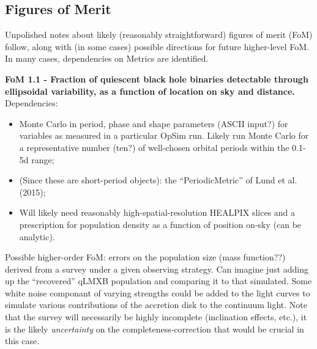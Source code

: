 
\subsection{Figures of Merit}
\label{sec:keyword:MW_Disk_metrics}


Unpolished notes about likely (reasonably straightforward) figures of
merit (FoM) follow, along with (in some cases) possible directions for
future higher-level FoM. In many cases, dependencies on
Metrics are identified.  


{\bf FoM 1.1 - Fraction of quiescent
  black hole binaries detectable through ellipsoidal variability, as a function of location on sky and distance.}
Dependencies:
\begin{itemize}
  \item Monte Carlo in period, phase and shape parameters (ASCII input?) for variables as measured in a particular OpSim run. Likely run Monte Carlo for a representative number (ten?) of well-chosen orbital periods within the 0.1-5d range;
  \item (Since these are short-period objects): the ``PeriodicMetric'' of Lund et al. (2015);
  \item Will likely need reasonably high-spatial-resolution HEALPIX slices and a prescription for population density as a function of position on-sky (can be analytic).
\end{itemize}
Possible higher-order FoM: errors on the population size (mass
function??) derived from a survey under a given observing
strategy. Can imagine just adding up the ``recovered'' qLMXB
population and comparing it to that simulated. Some white noise componant of varying strengths could be
added to the light curves to simulate various contributions of the accretion disk to the continuum light. 
Note that the survey will necessarily be highly incomplete (inclination effects, etc.), it
is the likely {\it uncertainty} on the completeness-correction that
would be crucial in this case. 

